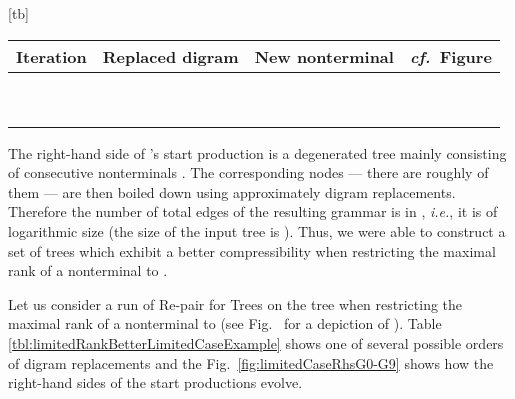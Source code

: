 \documentclass[12pt]{llncs}
\makeatletter
\renewenvironment{table}
               {\setlength\abovecaptionskip{10\p@}\setlength\belowcaptionskip{10\p@}\@float{table}}
               {\end@float}
\newcommand{\tp}{digram\xspace}
\newcommand{\hairsp}{\hspace{1pt}}\newcommand{\TODO}{\textcolor{red}{\bf TODO!}\xspace}
\newcommand{\ie}{\mbox{\textit{i.\hairsp{}e.}}\xspace}
\newcommand{\cf}{\textit{cf.}~}
\makeatother
\begin{document}
\begin{table}[tb]
	\centering
		\begin{tabular}{cccc}
			\toprule
			Iteration	&Replaced \tp		&New nonterminal	&\cf Figure\\
			\midrule
						&		&			&\subref{fig:limitedCaseRhsG1}\\
						&		&			&\subref{fig:limitedCaseRhsG2}\\
						&	&			&\subref{fig:limitedCaseRhsG3}\\
						&		&			&\subref{fig:limitedCaseRhsG4}\\
						&		&			&\subref{fig:limitedCaseRhsG5}\\
						&	&			&\subref{fig:limitedCaseRhsG6}\\
						&	&			&\subref{fig:limitedCaseRhsG7}\\
						&		&			&\subref{fig:limitedCaseRhsG8}\\
						&	&			&\subref{fig:limitedCaseRhsG9}\\
			\bottomrule
		\end{tabular}
	\caption{A run of Re-pair for Trees on the tree  with a maximal nonterminal rank of .}\label{tbl:limitedRankBetterLimitedCaseExample}
\end{table}
The right-hand side of 's start production is a degenerated tree mainly consisting of consecutive nonterminals . The corresponding nodes --- there are roughly  of them --- are then boiled down using approximately  \tp replacements. Therefore the number of total edges of the resulting grammar is in , \ie, it is of logarithmic size (the size of the input tree  is ). Thus, we were able to construct a set of trees which exhibit a better compressibility when restricting the maximal rank of a nonterminal to .
\begin{example}\label{ex:limitedRankBetterLimitedRank}
	Let us consider a run of Re-pair for Trees on the tree  when restricting the maximal rank of a nonterminal to  (see Fig.~ for a depiction of ). Table \ref{tbl:limitedRankBetterLimitedCaseExample} shows one of several possible orders of \tp replacements and the Fig.~\ref{fig:limitedCaseRhsG0-G9} shows how the right-hand sides of the start productions evolve.
\end{example}
			
\end{document}
